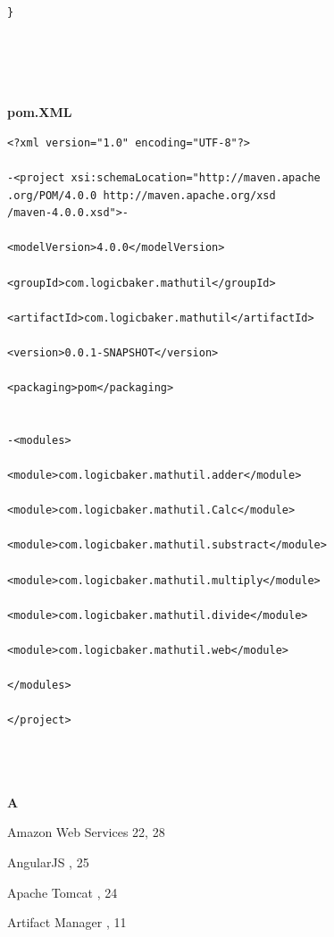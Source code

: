 \documentclass[12pt,a4paper,oneside]{report}
\begin{document}
{\begin{lstlisting}
  

}





\end{lstlisting}


\textbf{pom.XML}
\begin{lstlisting}
<?xml version="1.0" encoding="UTF-8"?>

-<project xsi:schemaLocation="http://maven.apache
.org/POM/4.0.0 http://maven.apache.org/xsd
/maven-4.0.0.xsd">-

<modelVersion>4.0.0</modelVersion>

<groupId>com.logicbaker.mathutil</groupId>

<artifactId>com.logicbaker.mathutil</artifactId>

<version>0.0.1-SNAPSHOT</version>

<packaging>pom</packaging>


-<modules>

<module>com.logicbaker.mathutil.adder</module>

<module>com.logicbaker.mathutil.Calc</module>

<module>com.logicbaker.mathutil.substract</module>

<module>com.logicbaker.mathutil.multiply</module>

<module>com.logicbaker.mathutil.divide</module>

<module>com.logicbaker.mathutil.web</module>

</modules>

</project>




\end{lstlisting}

\newpage

\begin{theindex}

\rhead{\empty}
\lhead{\empty}
\lfoot{\empty}
\vspace{.2in}
\large\textbf{A}
\item  Amazon Web Services 22, 28
\item  AngularJS , 25
\item Apache Tomcat  , 24
\item Artifact Manager , 11
\vspace{.2in}


\end{theindex}}
\end{document}
